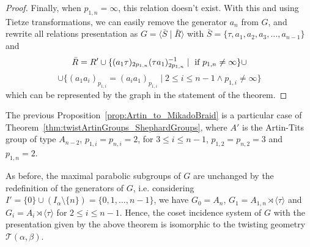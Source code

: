 \documentclass[11pt,letterpaper]{amsart}
\newcommand{\TT}{\mathcal{T}}
\begin{document}
\begin{proof}
Finally, when ${p_{1,n}}=\infty$, this relation doesn't exist.
With this and using Tietze transformations, we can easily remove the generator $a_n$ from $G$, and rewrite all relations presentation as
    $G = \langle \bar{S}\mid \bar{R}\rangle$
    with $\bar{S} = \{ \tau,a_1,a_2,a_3,\ldots,a_{n-1}\}$ and 
    $$\bar{R}=R'\cup \{(a_1\tau)_{2p_{1,n}} (\tau a_1)_{2p_{1,n}}^{-1}\mid \textnormal{ if }p_{1,n}\neq \infty\}\cup$$
    $$\cup \{(a_1a_i)_{p_{1,i}}=(a_ia_1)_{p_{1,i}}\mid 2\leq i\leq n-1\wedge p_{1,i}\neq\infty\}$$
which can be represented by the graph in the statement of the theorem. 
\end{proof} 

The previous Proposition~\ref{prop:Artin_to_MikadoBraid} is a particular case of Theorem~\ref{thm:twistArtinGroups_ShephardGroups}, where $A'$ is the Artin-Tits group of type $A_{n-2}$, $p_{1,i}=p_{n,i}=2$, for $3\leq i\leq n-1$, $p_{1,2}=p_{n,2}=3$ and $p_{1,n}=2$.

As before, the maximal parabolic subgroups of $G$ are unchanged by the redefinition of the generators of $G$, i.e. considering $I'=\{0\}\cup(I_\alpha\setminus\{n\})=\{0,1,\ldots,n-1\}$, we have $G_0=A_{n}$, $G_1 = A_{1,n}\rtimes \langle \tau\rangle$ and $G_i=A_i\rtimes\langle\tau\rangle$ for $2\leq i\leq n-1$. Hence, the coset incidence system of $G$ with the presentation given by the above theorem is isomorphic to the twisting geometry $\TT(\alpha,\beta)$.
\end{document}
